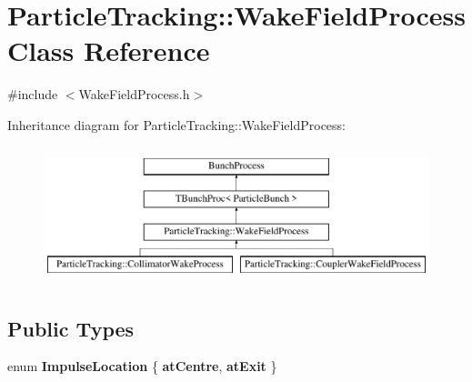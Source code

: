 \hypertarget{classParticleTracking_1_1WakeFieldProcess}{}\section{Particle\+Tracking\+:\+:Wake\+Field\+Process Class Reference}
\label{classParticleTracking_1_1WakeFieldProcess}


{\ttfamily \#include $<$Wake\+Field\+Process.\+h$>$}

Inheritance diagram for Particle\+Tracking\+:\+:Wake\+Field\+Process\+:\begin{figure}[H]
\begin{center}
\leavevmode
\includegraphics[height=4.000000cm]{classParticleTracking_1_1WakeFieldProcess}
\end{center}
\end{figure}
\subsection*{Public Types}
\begin{DoxyCompactItemize}
\item 
\mbox{\label{classParticleTracking_1_1WakeFieldProcess_a99d30580bd30ed65f89b90f824f48286}} 
enum {\bfseries Impulse\+Location} \{ {\bfseries at\+Centre}, 
{\bfseries at\+Exit}
 \}
\end{DoxyCompactItemize}
